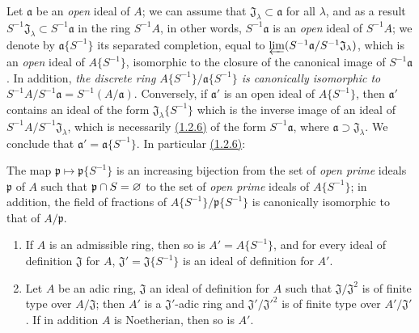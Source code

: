 \begin{env}[7.6.9]
\label{0.7.6.9}
Let $\mathfrak{a}$ be an {\em open} ideal of $A$; we can assume that
$\mathfrak{J}_\lambda\subset\mathfrak{a}$ for all $\lambda$, and as a result
$S^{-1}\mathfrak{J}_\lambda\subset S^{-1}\mathfrak{a}$ in the ring $S^{-1}A$, in other words,
$S^{-1}\mathfrak{a}$ is an {\em open} ideal of $S^{-1}A$; we denote by $\mathfrak{a}\{S^{-1}\}$ its
separated completion, equal to $\varprojlim(S^{-1}\mathfrak{a}/S^{-1}\mathfrak{J}_\lambda)$, which is
an {\em open} ideal of $A\{S^{-1}\}$, isomorphic to the closure of the canonical image of
$S^{-1}\mathfrak{a}$. In addition, {\em the discrete ring $A\{S^{-1}\}/\mathfrak{a}\{S^{-1}\}$ is
canonically isomorphic to $S^{-1}A/S^{-1}\mathfrak{a}=S^{-1}(A/\mathfrak{a})$}. Conversely, if
$\mathfrak{a}'$ is an open ideal of $A\{S^{-1}\}$, then $\mathfrak{a}'$ contains an ideal of the
form $\mathfrak{J}_\lambda\{S^{-1}\}$ which is the inverse image of an ideal of
$S^{-1}A/S^{-1}\mathfrak{J}_\lambda$, which is necessarily \hyperref[0.1.2.6]{(1.2.6)} of the
form $S^{-1}\mathfrak{a}$, where $\mathfrak{a}\supset\mathfrak{J}_\lambda$. We conclude that
$\mathfrak{a}'=\mathfrak{a}\{S^{-1}\}$. In particular \hyperref[0.1.2.6]{(1.2.6)}:
\end{env}

\begin{prop}[7.6.10]
\label{0.7.6.10}
The map $\mathfrak{p}\mapsto\mathfrak{p}\{S^{-1}\}$ is an increasing bijection from the set of
{\em open prime} ideals $\mathfrak{p}$ of $A$ such that $\mathfrak{p}\cap S=\varnothing$ to the set
of {\em open prime} ideals
of $A\{S^{-1}\}$; in addition, the field of fractions of $A\{S^{-1}\}/\mathfrak{p}\{S^{-1}\}$ is
canonically isomorphic to that of $A/\mathfrak{p}$.
\end{prop}

\begin{prop}[7.6.11]
\label{0.7.6.11}
\medskip\noindent
\begin{enumerate}[label={\rm(\roman*)}]
  \item If $A$ is an admissible ring, then so is $A'=A\{S^{-1}\}$, and for every ideal
    of definition $\mathfrak{J}$ for $A$, $\mathfrak{J}'=\mathfrak{J}\{S^{-1}\}$ is an ideal of
    definition for $A'$.
  \item Let $A$ be an adic ring, $\mathfrak{J}$ an ideal of definition for $A$ such that
    $\mathfrak{J}/\mathfrak{J}^2$ is of finite type over $A/\mathfrak{J}$; then $A'$ is a
    $\mathfrak{J}'$-adic ring and $\mathfrak{J}'/{\mathfrak{J}'}^2$ is of finite type over
    $A'/\mathfrak{J}'$. If in addition $A$ is Noetherian, then so is $A'$.
\end{enumerate}
\end{prop}

